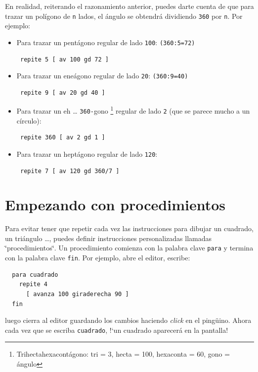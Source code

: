 \documentclass[12pt,twoside,spanish,a4paper]{report}
\begin{document}
En realidad, reiterando el razonamiento anterior, puedes darte cuenta
de que para trazar un pol\'igono de \texttt{n} lados, el \'angulo se obtendr\'a
dividiendo \texttt{360} por \texttt{n}. Por ejemplo:
\begin{itemize}
   \item Para trazar un pent\'agono regular de lado \texttt{100}:
      \texttt{(360:5=72)} 
      \begin{verbatim}
 repite 5 [ av 100 gd 72 ] \end{verbatim}
   \item Para trazar un ene\'agono regular de lado \texttt{20}:
      \texttt{(360:9=40)}
      \begin{verbatim}
 repite 9 [ av 20 gd 40 ] \end{verbatim}
   \item Para trazar un eh \ldots{} \texttt{360-}gono%
      \footnote{Trihectahexacont\'agono:
                tri = 3, hecta = 100, hexaconta = 60,
                gono = \'angulo}
      regular de lado \texttt{2} (que se parece mucho a un c\'irculo):
      \begin{verbatim}
 repite 360 [ av 2 gd 1 ] \end{verbatim}
   \item Para trazar un hept\'agono regular de lado \texttt{120}:
      \begin{verbatim}
 repite 7 [ av 120 gd 360/7 ] \end{verbatim}
\end{itemize}

\section{Empezando con procedimientos}
   \label{sub:Procedimientos}

Para evitar tener que repetir cada vez las instrucciones para dibujar
un cuadrado, un tri\'angulo \ldots{}, puedes definir instrucciones
personalizadas llamadas \char`\"{}procedimientos\char`\"{}. Un procedimiento
comienza con la palabra clave \texttt{para} y termina con la palabra
clave \texttt{fin}. Por ejemplo, abre el editor, escribe:
\begin{verbatim}
  para cuadrado
    repite 4
      [ avanza 100 giraderecha 90 ]
  fin \end{verbatim}
\noindent luego cierra al editor guardando los cambios haciendo
\textit{click} en el ping\"uino. Ahora cada vez que se escriba
\texttt{cuadrado}, !`un cuadrado aparecer\'a en la pantalla!
\end{document}
